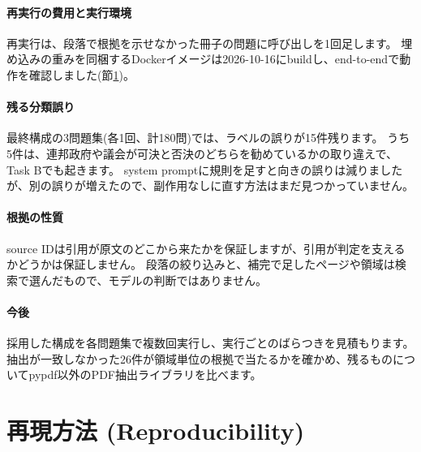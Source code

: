 \documentclass[10pt,a4paper]{ltjsarticle}
\begin{document}
\paragraph{再実行の費用と実行環境}
再実行は、段落で根拠を示せなかった冊子の問題に呼び出しを1回足します。
埋め込みの重みを同梱するDockerイメージは2026-10-16にbuildし、end-to-endで動作を確認しました(節\ref{sec:repro})。

\paragraph{残る分類誤り}
最終構成の3問題集(各1回、計180問)では、ラベルの誤りが15件残ります。
うち5件は、連邦政府や議会が可決と否決のどちらを勧めているかの取り違えで、Task Bでも起きます。
system promptに規則を足すと向きの誤りは減りましたが、別の誤りが増えたので、副作用なしに直す方法はまだ見つかっていません。

\paragraph{根拠の性質}
source IDは引用が原文のどこから来たかを保証しますが、引用が判定を支えるかどうかは保証しません\cite{gao2023alce}。
段落の絞り込みと、補完で足したページや領域は検索で選んだもので、モデルの判断ではありません。

\paragraph{今後}
採用した構成を各問題集で複数回実行し、実行ごとのばらつきを見積もります。
抽出が一致しなかった26件が領域単位の根拠で当たるかを確かめ、残るものについてpypdf以外のPDF抽出ライブラリを比べます。

\section{再現方法 (Reproducibility)}
\label{sec:repro}
\end{document}
